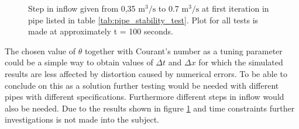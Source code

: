 \begin{figure}[H]
 \centering
 
\caption{Step in inflow given from 0,35 $\text{m}^\text{3}/ \text{s}$ to 0.7 $\text{m}^\text{3}/ \text{s}$ at first iteration in pipe listed in table \ref{tab:pipe_stability_test}. Plot for all tests is made at approximately t = 100 seconds.}
\label{fig:stability_test_theta_0_65}
\end{figure}

The chosen value of $\theta$ together with Courant's number as a tuning parameter could be a simple way to obtain values of $\Delta t$ and $\Delta x$ for which the simulated results are less affected by distortion caused by numerical errors. To be able to conclude on this as a solution further testing would be needed with different pipes with different specifications. Furthermore different steps in inflow would also be needed. Due to the results shown in figure \ref{fig:stability_test_theta_0_65} and time constraints further investigations is not made into the subject.   

